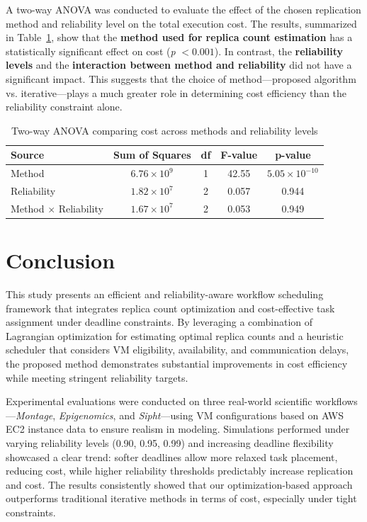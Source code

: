 \documentclass[12pt]{tcc}
\begin{document}
A two-way ANOVA was conducted to evaluate the effect of the chosen replication method and reliability level on the total execution cost. The results, summarized in Table~\ref{tab:anova}, show that the \textbf{method used for replica count estimation} has a statistically significant effect on cost (\textit{p} $< 0.001$). In contrast, the \textbf{reliability levels} and the \textbf{interaction between method and reliability} did not have a significant impact. This suggests that the choice of method—proposed algorithm vs. iterative—plays a much greater role in determining cost efficiency than the reliability constraint alone.

\begin{table}[h!]
    \centering
    \caption{Two-way ANOVA comparing cost across methods and reliability levels}
    \label{tab:anova}
    \begin{tabular}{lcccc}
        \toprule
        \textbf{Source} & \textbf{Sum of Squares} & \textbf{df} & \textbf{F-value} & \textbf{p-value} \\
        \midrule
        Method & $6.76 \times 10^{9}$ & 1 & 42.55 & $5.05 \times 10^{-10}$ \\
        Reliability & $1.82 \times 10^{7}$ & 2 & 0.057 & 0.944 \\
        Method $\times$ Reliability & $1.67 \times 10^{7}$ & 2 & 0.053 & 0.949 \\
      
        \bottomrule
    \end{tabular}
\end{table}




	
	
	\chapter{Conclusion}
	\label{sec_conclusion}
	
	This study presents an efficient and reliability-aware workflow scheduling framework that integrates replica count optimization and cost-effective task assignment under deadline constraints. By leveraging a combination of Lagrangian optimization for estimating optimal replica counts and a heuristic scheduler that considers VM eligibility, availability, and communication delays, the proposed method demonstrates substantial improvements in cost efficiency while meeting stringent reliability targets.

Experimental evaluations were conducted on three real-world scientific workflows—\textit{Montage}, \textit{Epigenomics}, and \textit{Sipht}—using VM configurations based on AWS EC2 instance data to ensure realism in modeling. Simulations performed under varying reliability levels (0.90, 0.95, 0.99) and increasing deadline flexibility showcased a clear trend: softer deadlines allow more relaxed task placement, reducing cost, while higher reliability thresholds predictably increase replication and cost. The results consistently showed that our optimization-based approach outperforms traditional iterative methods in terms of cost, especially under tight constraints.
\end{document}

